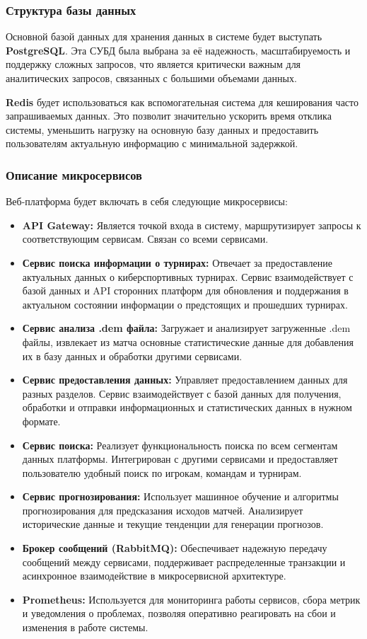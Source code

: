 \subsubsection{Структура базы данных}

Основной базой данных для хранения данных в системе будет выступать \textbf{PostgreSQL}. Эта СУБД была выбрана за её надежность, масштабируемость и поддержку сложных запросов, что является критически важным для аналитических запросов, связанных с большими объемами данных.

\textbf{Redis} будет использоваться как вспомогательная система для кеширования часто запрашиваемых данных. Это позволит значительно ускорить время отклика системы, уменьшить нагрузку на основную базу данных и предоставить пользователям актуальную информацию с минимальной задержкой.

\subsubsection{Описание микросервисов}

Веб-платформа будет включать в себя следующие микросервисы:

\begin{itemize}
	\item \textbf{API Gateway:	} Является точкой входа в систему, маршрутизирует запросы к соответствующим сервисам. Связан со всеми сервисами.
	\item \textbf{Сервис поиска информации о турнирах:} Отвечает за предоставление актуальных данных о киберспортивных турнирах. Сервис взаимодействует с базой данных и API сторонних платформ для обновления и поддержания в актуальном состоянии информации о предстоящих и прошедших турнирах.
	\item \textbf{Сервис анализа .dem файла:} Загружает и анализирует загруженные .dem файлы, извлекает из матча основные статистические данные для добавления их в базу данных и обработки другими сервисами.
	\item \textbf{Сервис предоставления данных:} Управляет предоставлением данных для разных разделов. Сервис взаимодействует с базой данных для получения, обработки и отправки информационных и статистических данных в нужном формате.
	\item \textbf{Сервис поиска:} Реализует функциональность поиска по всем сегментам данных платформы. Интегрирован с другими сервисами и предоставляет пользователю удобный поиск по игрокам, командам и турнирам.
	\item \textbf{Сервис прогнозирования:} Использует машинное обучение и алгоритмы прогнозирования для предсказания исходов матчей. Анализирует исторические данные и текущие тенденции для генерации прогнозов.
	\item \textbf{Брокер сообщений (RabbitMQ):} Обеспечивает надежную передачу сообщений между сервисами, поддерживает распределенные транзакции и асинхронное взаимодействие в микросервисной архитектуре.
	\item \textbf{Prometheus:} Используется для мониторинга работы сервисов, сбора метрик и уведомления о проблемах, позволяя оперативно реагировать на сбои и изменения в работе системы.
\end{itemize}

